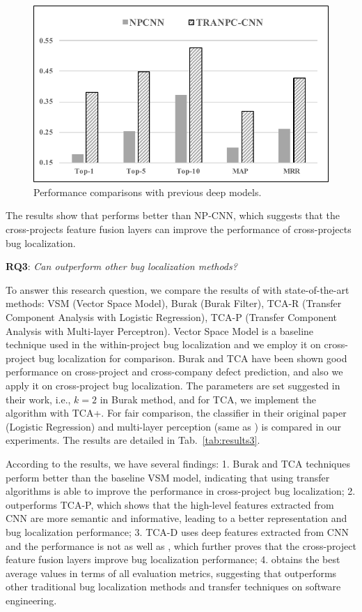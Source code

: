 \begin{figure}[hbt]
\centering
\includegraphics[width = 0.9\columnwidth]{pic/results2.pdf}
\caption{Performance comparisons with previous deep models.}
\label{fig:results2}
\end{figure}

The results show that \TRANPCNN performs better than NP-CNN, which suggests that the cross-projects feature fusion layers can improve the performance of cross-projects bug localization.

\textbf{RQ3}: \textit{Can \TRANPCNN outperform other bug localization methods?}

To answer this research question, we compare the results of \TRANPCNN with state-of-the-art methods: VSM (Vector Space Model), Burak (Burak Filter), TCA-R (Transfer Component Analysis with Logistic Regression), TCA-P (Transfer Component Analysis with Multi-layer Perceptron). Vector Space Model is a baseline technique used in the within-project bug localization and we employ it on cross-project bug localization for comparison. Burak and TCA have been shown good performance on cross-project and cross-company defect prediction, and also we apply it on cross-project bug localization. The parameters are set suggested in their work, i.e., $k=2$ in Burak method, and for TCA, we implement the algorithm with TCA+. For fair comparison, the classifier in their original paper (Logistic Regression) and multi-layer perception (same as \TRANPCNN) is compared in our experiments. The results are detailed in Tab.~\ref{tab:results3}.

According to the results, we have several findings: 1. Burak and TCA techniques perform better than the baseline VSM model, indicating that using transfer algorithms is able to improve the performance in cross-project bug localization; 2. \TRANPCNN outperforms TCA-P, which shows that the high-level features extracted from CNN are more semantic and informative, leading to a better representation and bug localization performance; 3. TCA-D uses deep features extracted from CNN and the performance is not as well as \TRANPCNN, which further proves that the cross-project feature fusion layers improve bug localization performance; 4. \TRANPCNN obtains the best average values in terms of all evaluation metrics, suggesting that \TRANPCNN outperforms other traditional bug localization methods and transfer techniques on software engineering.


